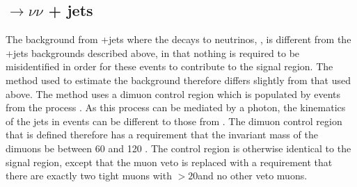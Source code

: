 \subsection{\PZ$\rightarrow \nu\nu$ + jets}
\label{sec:promptznunu}
The background from \PZ+jets where the \PZ decays to neutrinos, \Znunu, is different from the \PW+jets backgrounds described above, in that nothing is required to be misidentified in order for these events to contribute to the signal region. The method used to estimate the \Znunu background therefore differs slightly from that used above. The method uses a dimuon control region which is populated by events from the process \Zmumu. As this process can be mediated by a photon, the kinematics of the jets in \Zmumu events can be different to those from \Znunu. The dimuon control region that is defined therefore has a requirement that the invariant mass of the dimuons be between 60 and 120 \GeV. The control region is otherwise identical to the signal region, except that the muon veto is replaced with a requirement that there are exactly two tight muons with \pt$>20$\GeV and no other veto muons.

